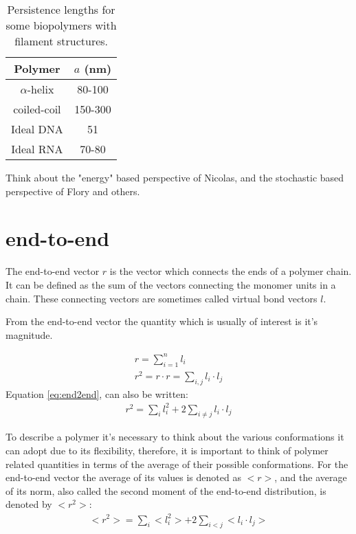 \begin{table}[htbp]
\begin{center}  
\begin{tabular}{c|c}
\hline
Polymer       & $a$ (nm)   \\ \hline
$\alpha$-helix & 80-100\\
coiled-coil & 150-300\\
Ideal DNA  &  51  \\
Ideal RNA & 70-80 \\
\hline
\end{tabular}
\caption{Persistence lengths for some biopolymers with filament structures.}
\end{center}
\end{table}

Think about the "energy" based perspective of Nicolas, and the
stochastic based perspective of Flory and others.

\section{end-to-end}
The end-to-end vector  $r$ is the vector which connects  the ends of a 
polymer chain.  It  can be defined  as the sum  of the vectors connecting the
monomer units in a chain. These connecting vectors are sometimes called
virtual  bond vectors $l$.  

From  the end-to-end  vector  the quantity
which is usually of interest is it's magnitude.

\begin{gather}
\label{eq:end2end}
r = \sum_{i=1}^{n} l_{i}\\
r^2 = r \cdot r = \sum_{i,j}l_{i} \cdot l_{j}
\end{gather}
Equation \ref{eq:end2end}, can also be written:
\begin{gather}
r^2 = \sum_{i}l_{i}^{2} + 2 \sum_{i\neq j} l_{i} \cdot l_{j}
\end{gather}  

To  describe a  polymer  it's  necessary to  think  about the  various
conformations it can adopt  due to its flexibility, therefore, it
is important  to think of polymer  related quantities in  terms of the
average of their possible conformations. For the end-to-end vector the
average of  its values  is denoted  as $<r>$, and  the average  of its
norm, also called the second moment of the end-to-end distribution, is
denoted by $<r^2>$:
\begin{gather}
\label{eq:secmom}  
<r^2>=\sum_{i}<l_{i}^2> + 2\sum_{i<j}<l_{i} \cdot l_{j}>
\end{gather}  

